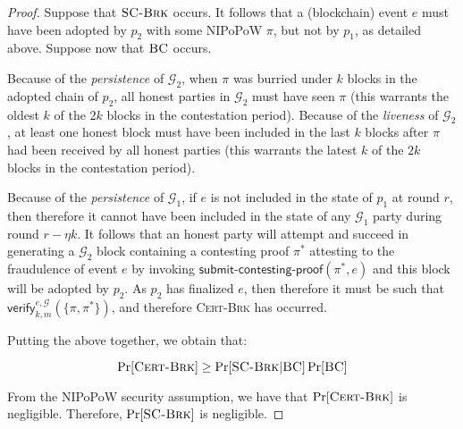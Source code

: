 \begin{proof}
  Suppose that $\textsc{SC-Brk}$ occurs. It follows that a (blockchain) event
  $e$ must have been adopted by $p_2$ with some NIPoPoW $\pi$, but not by $p_1$,
  as detailed above. Suppose now that $\textsc{BC}$ occurs.

  Because of the \emph{persistence} of $\mathcal{G}_2$, when $\pi$ was burried
  under $k$ blocks in the adopted chain of $p_2$, all honest parties in
  $\mathcal{G}_2$ must have seen $\pi$ (this warrants the oldest $k$ of the $2k$
  blocks in the contestation period). Because of the \emph{liveness} of
  $\mathcal{G}_2$, at least one honest block must have been included in the last
  $k$ blocks after $\pi$ had been received by all honest parties (this warrants
  the latest $k$ of the $2k$ blocks in the contestation period).

  Because of the \emph{persistence} of $\mathcal{G}_1$, if $e$ is not included
  in the state of $p_1$ at round $r$, then therefore it cannot have been
  included in the state of any $\mathcal{G}_1$ party during round $r - \eta k$.
  It follows that an honest party will attempt and succeed in generating a
  $\mathcal{G}_2$ block containing a contesting proof $\pi^*$ attesting to the
  fraudulence of event $e$ by invoking
  $\textsf{submit-contesting-proof}(\pi^*, e)$ and this block will be adopted by
  $p_2$. As $p_2$ has finalized $e$, then therefore it must be such that
  $\textsf{verify}^{e, \mathcal{G}}_{k,m}(\{\pi, \pi^*\})$, and therefore
  \textsc{Cert-Brk} has occurred.

  Putting the above together, we obtain that:

  \[
  \Pr[\textsc{Cert-Brk}] \geq \Pr[\textsc{SC-Brk}|\textsc{BC}]\Pr[\textsc{BC}]
  \]

  From the NIPoPoW security assumption, we have that $\Pr[\textsc{Cert-Brk}]$ is
  negligible. Therefore, $\Pr[\textsc{SC-Brk}]$ is negligible.
\end{proof}

